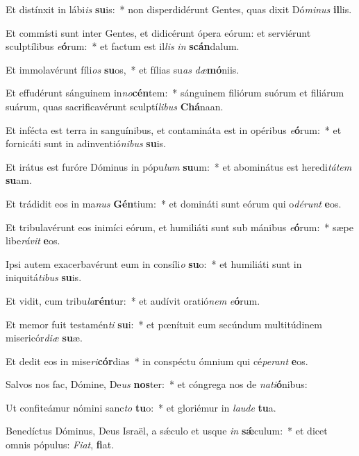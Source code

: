 \item Et distínxit in lábi\textit{is} \textbf{su}is:~* non disperdidérunt Gentes, quas dixit Dó\textit{mi}\textit{nus} \textbf{il}lis.
\item Et commísti sunt inter Gentes, et didicérunt ópera eórum: et serviérunt sculptílibus \textit{e}\textbf{ó}rum:~* et factum est il\textit{lis} \textit{in} \textbf{scán}dalum.
\item Et immolavérunt fíli\textit{os} \textbf{su}os,~* et fílias su\textit{as} \textit{dæ}\textbf{mó}niis.
\item Et effudérunt sánguinem in\textit{no}\textbf{cén}tem:~* sánguinem filiórum suórum et filiárum suárum, quas sacrificavérunt sculptí\textit{li}\textit{bus} \textbf{Chá}naan.
\item Et infécta est terra in sanguínibus, et contamináta est in opéribus \textit{e}\textbf{ó}rum:~* et fornicáti sunt in adinventió\textit{ni}\textit{bus} \textbf{su}is.
\item Et irátus est furóre Dóminus in pópu\textit{lum} \textbf{su}um:~* et abominátus est heredi\textit{tá}\textit{tem} \textbf{su}am.
\item Et trádidit eos in ma\textit{nus} \textbf{Gén}tium:~* et domináti sunt eórum qui o\textit{dé}\textit{runt} \textbf{e}os.
\item Et tribulavérunt eos inimíci eórum, et humiliáti sunt sub mánibus \textit{e}\textbf{ó}rum:~* sæpe libe\textit{rá}\textit{vit} \textbf{e}os.
\item Ipsi autem exacerbavérunt eum in consíli\textit{o} \textbf{su}o:~* et humiliáti sunt in iniquitá\textit{ti}\textit{bus} \textbf{su}is.
\item Et vidit, cum tribu\textit{la}\textbf{rén}tur:~* et audívit oratió\textit{nem} \textit{e}\textbf{ó}rum.
\item Et memor fuit testamén\textit{ti} \textbf{su}i:~* et pœnítuit eum secúndum multitúdinem misericór\textit{di}\textit{æ} \textbf{su}æ.
\item Et dedit eos in mise\textit{ri}\textbf{cór}dias~* in conspéctu ómnium qui cé\textit{pe}\textit{rant} \textbf{e}os.
\item Salvos nos fac, Dómine, De\textit{us} \textbf{nos}ter:~* et cóngrega nos de \textit{na}\textit{ti}\textbf{ó}nibus:
\item Ut confiteámur nómini sanc\textit{to} \textbf{tu}o:~* et gloriémur in \textit{lau}\textit{de} \textbf{tu}a.
\item Benedíctus Dóminus, Deus Israël, a sǽculo et usque \textit{in} \textbf{sǽ}culum:~* et dicet omnis pópulus: \textit{Fi}\textit{at}, \textbf{fi}at.
